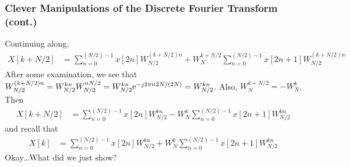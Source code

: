 \documentclass[mathserif,9pt,handout]{beamer}
\begin{document}
\begin{frame}\frametitle{Clever Manipulations of the Discrete Fourier Transform (cont.)}\small
  Continuing along, 
  \begin{align}
    X[k+N/2] &= \sum_{n=0}^{(N/2)-1} x[2n] W_{N/2}^{(k+N/2)n} + W_N^{k+N/2} \sum_{n=0}^{(N/2)-1} x[2n+1] W_{N/2}^{(k+N/2)n} \nonumber 
  \end{align}
  After some examination, we see that $W_{N/2}^{(k+N/2)n} = W_{N/2}^{kn} W_{N/2}^{nN/2} = W_{N/2}^{kn} {\textrm{e}}^{-j2\pi n 2N/(2N)} = W_{N/2}^{kn}$. Also, $W_N^{k+N/2} =  -W_N^{k}$. Then 
  \begin{align}
    X[k+N/2] &= \sum_{n=0}^{(N/2)-1} x[2n] W_{N/2}^{kn} -W_N^{k} \sum_{n=0}^{(N/2)-1} x[2n+1] W_{N/2}^{kn}\nonumber 
  \end{align}
  and recall that 
  \begin{align}
    X[k] &= \sum_{n=0}^{(N/2)-1} x[2n] W_{N/2}^{kn} + W_N^{k} \sum_{n=0}^{(N/2)-1} x[2n+1] W_{N/2}^{kn} \nonumber 
  \end{align}
  Okay\ldots What did we just show? 
\end{frame}
\end{document}
